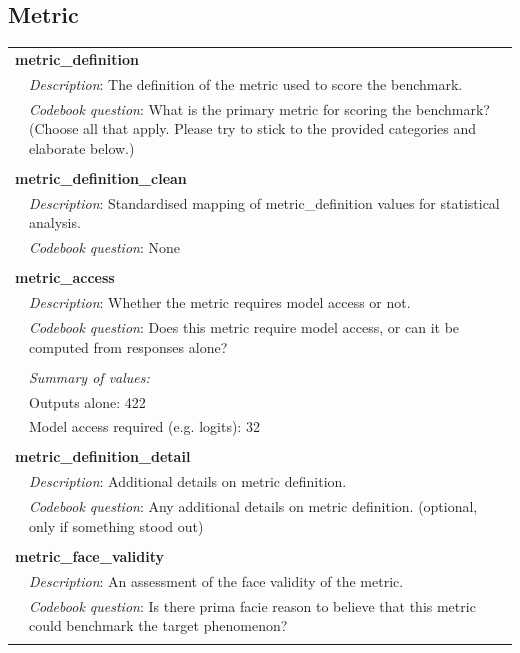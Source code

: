 \subsection{\textcolor{metric}{Metric}}
{\small\begin{longtable}{p{}p{}}
\multicolumn{2}{l}{\textbf{metric\_definition}} \\
& \textit{Description}: The definition of the metric used to score the benchmark. \\
& \textit{Codebook question}: What is the primary metric for scoring the benchmark? (Choose all that apply. Please try to stick to the provided categories and elaborate below.) \\
\\
\multicolumn{2}{l}{\textbf{metric\_definition\_clean}} \\
& \textit{Description}: Standardised mapping of metric\_definition values for statistical analysis. \\
& \textit{Codebook question}: None \\
\\
\multicolumn{2}{l}{\textbf{metric\_access}} \\
& \textit{Description}: Whether the metric requires model access or not. \\
& \textit{Codebook question}: Does this metric require model access, or can it be computed from responses alone? \\
\\
& \textit{Summary of values:} \\
& Outputs alone: 422 \\
& Model access required (e.g. logits): 32 \\
\\
\multicolumn{2}{l}{\textbf{metric\_definition\_detail}} \\
& \textit{Description}: Additional details on metric definition. \\
& \textit{Codebook question}: Any additional details on metric definition. (optional, only if something stood out) \\
\\
\multicolumn{2}{l}{\textbf{metric\_face\_validity}} \\
& \textit{Description}: An assessment of the face validity of the metric. \\
& \textit{Codebook question}: Is there prima facie reason to believe that this metric could benchmark the target phenomenon? \\
\\

\end{longtable}}
